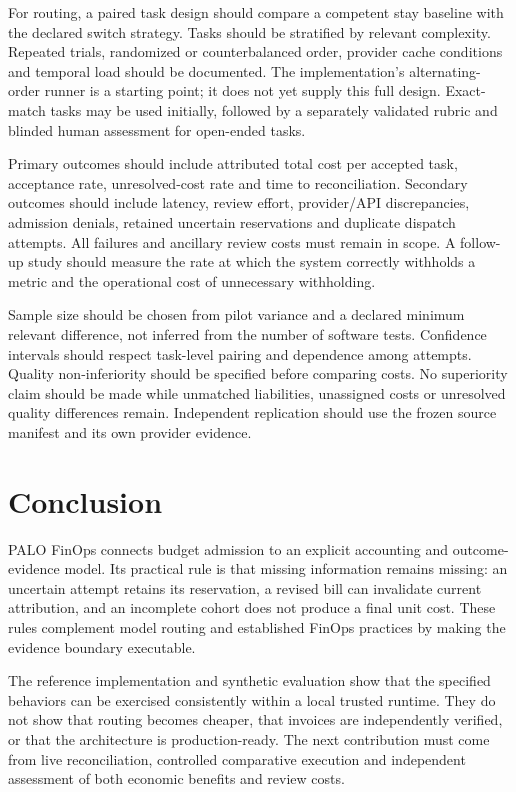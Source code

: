 \documentclass[10pt,twocolumn]{article}
\begin{document}
For routing, a paired task design should compare a competent stay baseline with the declared switch strategy. Tasks should be stratified by relevant complexity. Repeated trials, randomized or counterbalanced order, provider cache conditions and temporal load should be documented. The implementation's alternating-order runner is a starting point; it does not yet supply this full design. Exact-match tasks may be used initially, followed by a separately validated rubric and blinded human assessment for open-ended tasks.

Primary outcomes should include attributed total cost per accepted task, acceptance rate, unresolved-cost rate and time to reconciliation. Secondary outcomes should include latency, review effort, provider/API discrepancies, admission denials, retained uncertain reservations and duplicate dispatch attempts. All failures and ancillary review costs must remain in scope. A follow-up study should measure the rate at which the system correctly withholds a metric and the operational cost of unnecessary withholding.

Sample size should be chosen from pilot variance and a declared minimum relevant difference, not inferred from the number of software tests. Confidence intervals should respect task-level pairing and dependence among attempts. Quality non-inferiority should be specified before comparing costs. No superiority claim should be made while unmatched liabilities, unassigned costs or unresolved quality differences remain. Independent replication should use the frozen source manifest and its own provider evidence.

\section{Conclusion}

PALO FinOps connects budget admission to an explicit accounting and outcome-evidence model. Its practical rule is that missing information remains missing: an uncertain attempt retains its reservation, a revised bill can invalidate current attribution, and an incomplete cohort does not produce a final unit cost. These rules complement model routing and established FinOps practices by making the evidence boundary executable.

The reference implementation and synthetic evaluation show that the specified behaviors can be exercised consistently within a local trusted runtime. They do not show that routing becomes cheaper, that invoices are independently verified, or that the architecture is production-ready. The next contribution must come from live reconciliation, controlled comparative execution and independent assessment of both economic benefits and review costs.
\end{document}
